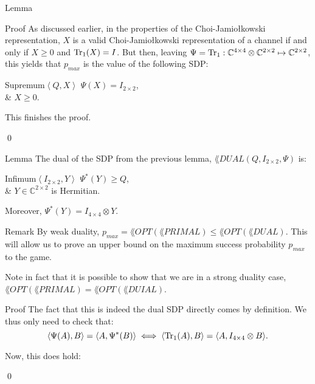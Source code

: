 \documentclass[a4paper]{article}
\begin{document}
\begin{parag}{Lemma}
\begin{subparag}{Proof}
        As discussed earlier, in the properties of the Choi-Jamio{\l}kowski representation, $X$ is a valid Choi-Jamio{\l}kowski representation of a channel if and only if $X \geq 0$ and $\Tr_1\left(X\right) = I$. But then, leaving $\Psi = \operatorname{Tr}_1: \mathbb{C}^{4 \times 4} \otimes \mathbb{C}^{2 \times 2} \mapsto \mathbb{C}^{2 \times 2}$, this yields that $p_{max}$ is the value of the following SDP:
        \begin{semidefiniteprogram}{Supremum}{$\left\langle Q, X \right\rangle$}
            $\Psi\left(X\right) = I_{2 \times 2}$,\\
            & $X \geq 0$.
        \end{semidefiniteprogram}

        This finishes the proof.
        
        \qed
    \end{subparag}
\end{parag}

\begin{parag}{Lemma}
    The dual of the SDP from the previous lemma, $\lang{DUAL}\left(Q, I_{2 \times 2}, \Psi\right)$ is: 
    \begin{semidefiniteprogram}{Infimum}{$\left\langle I_{2 \times 2}, Y \right\rangle$}
        $\Psi^*\left(Y\right) \geq Q$,\\
        & $Y \in \mathbb{C}^{2 \times 2}$ is Hermitian.
    \end{semidefiniteprogram}

    Moreover, $\Psi^*\left(Y\right) = I_{4 \times 4} \otimes Y$.

    \begin{subparag}{Remark}
        By weak duality, $p_{max} = \lang{OPT}\left(\lang{PRIMAL}\right) \leq \lang{OPT}\left(\lang{DUAL}\right)$. This will allow us to prove an upper bound on the maximum success probability $p_{max}$ to the  game.

        Note in fact that it is possible to show that we are in a strong duality case, $\lang{OPT}\left(\lang{PRIMAL}\right) = \lang{OPT}\left(\lang{DUIAL}\right)$.
    \end{subparag}

    \begin{subparag}{Proof}
        The fact that this is indeed the dual SDP directly comes by definition. We thus only need to check that: 
        \[\left\langle \Psi\left(A\right), B \right\rangle = \left\langle A, \Psi^*\left(B\right) \right\rangle \iff \left\langle \Tr_1\left(A\right), B \right\rangle = \left\langle A, I_{4 \times 4} \otimes B \right\rangle.\]
        
        Now, this does hold:
        
        \qed
    \end{subparag}
\end{parag}
\end{document}
